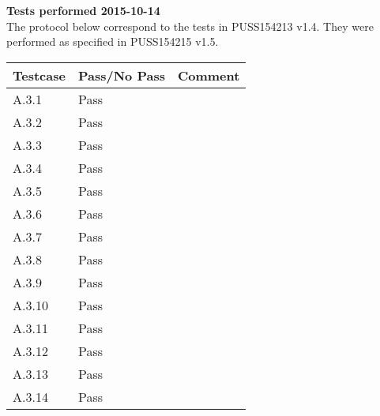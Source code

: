 \renewcommand{\testdate}{2015-10-14}
\textbf{ Tests performed \testdate} \\
The protocol below correspond to the tests in PUSS154213 v1.4. They were performed as specified in PUSS154215 v1.5.
\begin{center}
  	\begin{tabular}{| p{3cm} | p{5cm} | p{5cm} |}
    		\hline
	    	\textbf{Testcase}			& \textbf{Pass/No Pass} 	& \textbf{Comment} \\ \hline
    		A.3.1		 						& Pass 										&  				\\ \hline
    		A.3.2		 						& Pass 										& 				 \\	\hline
    		A.3.3		 						& Pass 										& 				 \\	\hline
    		A.3.4		 						& Pass 										& 				 \\	\hline
    		A.3.5		 						& Pass 										& 				 \\	\hline
    		A.3.6		 						& Pass 										& 				 \\	\hline
    		A.3.7		 						& Pass 										& 				 \\	\hline
    		A.3.8		 						& Pass 										& 				 \\	\hline
    		A.3.9		 						& Pass 										& 				 \\	\hline
    		A.3.10	 							& Pass 										& 				 \\	\hline
    		A.3.11	 							& Pass 										& 				 \\	\hline
    		A.3.12	 							& Pass 										& 				 \\	\hline
    		A.3.13	 							& Pass 										& 				 \\	\hline
    		A.3.14	 							& Pass 										& 				 \\	\hline
 	\end{tabular}
\end{center}
